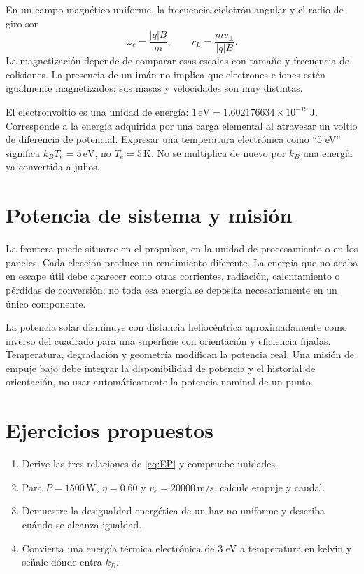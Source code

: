 En un campo magnético uniforme, la frecuencia ciclotrón angular y el radio de giro son
\[
 \omega_c=\frac{|q|B}{m},\qquad r_L=\frac{mv_\perp}{|q|B}.
\]
La magnetización depende de comparar esas escalas con tamaño y frecuencia de colisiones. La presencia de un imán no implica que electrones e iones estén igualmente magnetizados: sus masas y velocidades son muy distintas.

El electronvoltio es una unidad de energía: $1\,\mathrm{eV}=1.602176634\times10^{-19}\,\mathrm J$. Corresponde a la energía adquirida por una carga elemental al atravesar un voltio de diferencia de potencial. Expresar una temperatura electrónica como ``5 eV'' significa $k_BT_e=5\,\mathrm{eV}$, no $T_e=5\,\mathrm K$. No se multiplica de nuevo por $k_B$ una energía ya convertida a julios.
\section{Potencia de sistema y misión}
La frontera puede situarse en el propulsor, en la unidad de procesamiento o en los paneles. Cada elección produce un rendimiento diferente. La energía que no acaba en escape útil debe aparecer como otras corrientes, radiación, calentamiento o pérdidas de conversión; no toda esa energía se deposita necesariamente en un único componente.

La potencia solar disminuye con distancia heliocéntrica aproximadamente como inverso del cuadrado para una superficie con orientación y eficiencia fijadas. Temperatura, degradación y geometría modifican la potencia real. Una misión de empuje bajo debe integrar la disponibilidad de potencia y el historial de orientación, no usar automáticamente la potencia nominal de un punto.
\section{Ejercicios propuestos}
\begin{enumerate}
\item Derive las tres relaciones de \eqref{eq:EP} y compruebe unidades.
\item Para $P=1500\,\mathrm W$, $\eta=0.60$ y $v_e=20000\,\mathrm{m/s}$, calcule empuje y caudal.
\item Demuestre la desigualdad energética de un haz no uniforme y describa cuándo se alcanza igualdad.
\item Convierta una energía térmica electrónica de 3 eV a temperatura en kelvin y señale dónde entra $k_B$.
\end{enumerate}
